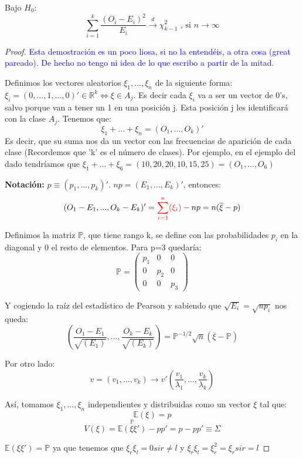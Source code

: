 \documentclass[nochap]{apuntes}
\begin{document}
\begin{theorem}
Bajo $H_0$:
\[
\sum_{i=1}^k \frac{(O_i-E_i)^2}{E_i} \stackrel{d}{\rightarrow} \chi^2_{k-1} \text{ , si } n \rightarrow \infty
\]
\end{theorem}
\begin{proof}
\textcolor{blue}{Esta demostración es un poco liosa, si no la entendéis, a otra cosa (great pareado). De hecho no tengo ni idea de lo que escribo a partir de la mitad.}

Definimos los vectores aleatorios $\xi_1,...,\xi_n$ de la siguiente forma: $\xi_i=(0,...,1,...,0)' \in \mathbb{R}^k \Leftrightarrow \xi \in A_j$. Es decir cada $\xi_i$ va a ser un vector de 0's, salvo porque van a tener un 1 en una posición j. Esta posición j les identificará con la clase $A_j$. Tenemos que:
\[
\xi_1+...+\xi_n=(O_1,...,O_k)'
\]
Es decir, que su suma nos da un vector con las frecuencias de aparición de cada clase (Recordemos que 'k' es el número de clases). Por ejemplo, en el ejemplo del dado tendríamos que $\xi_1+...+\xi_6=(10,20,20,10,15,25)=(O_1,...,O_6)$

\textbf{Notación: } $p\equiv (p_1,...,p_k)'$. $np=(E_1,...,E_k)'$, entonces:
\[
(O_1-E_1,...,O_k-E_k)'=\textcolor{red}{\sum_{i=1}^n(\xi_i)}-np=n(\overline{\xi}-p)
\]

Definimos la matriz $\mathbb{P}$, que tiene rango k, se define con las probabilidades $p_i$ en la diagonal y 0 el resto de elementos. Para p=3 quedaría:
\[
\mathbb{P}=\left(
\begin{array}{ccc}
p_1& 0 & 0 \\
0 & p_2& 0 \\
0 & 0 & p_3
\end{array}
\right)
\]

Y cogiendo la raíz del estadístico de Pearson y sabiendo que $\sqrt{E_i}=\sqrt{np_i}$ nos queda:
\[
\left(\frac{O_1-E_1}{\sqrt{(E_1)}},...,\frac{O_k-E_k}{\sqrt{(E_k)}}  \right) = \mathbb{P}^{-1/2}\sqrt{n} (\overline{\xi}-\mathbb{P})
\]

Por otro lado: 
\[
v=(v_1,...,v_k) \rightarrow v'(\frac{v_1}{\lambda_1},...,\frac{v_k}{\lambda_k})
\]

Así, tomamos $\xi_1,...,\xi_n$ independientes y distribuidas como un vector $\xi$ tal que:
\[
\mathbb{E}(\xi)=p
\]
\[
V(\xi)=\stackrel{\mathbb{P}}{\mathbb{E}(\xi \xi')} -pp' = p-pp' \equiv \Sigma 
\]

$\mathbb{E}(\xi\xi')=\mathbb{P}$ ya que tenemos que $\xi_r \xi_l = 0 si r \neq l$ y $\xi_r \xi_l = \xi_r^2=\xi_r si r = l$ 


\end{proof}
\end{document}
